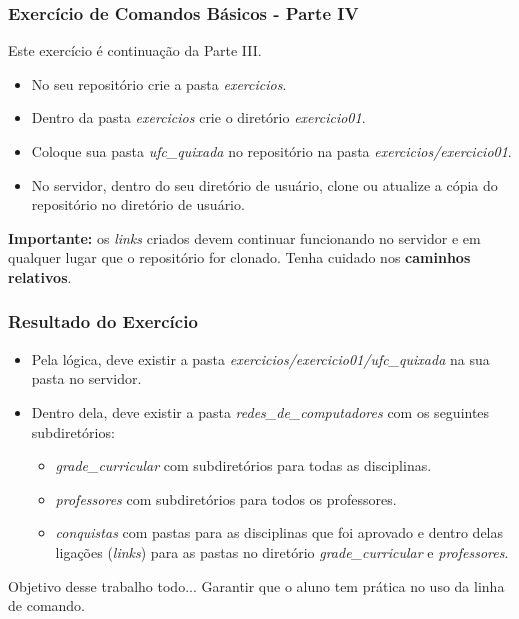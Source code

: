 \documentclass{beamer}
\begin{document}
   \begin{frame}
      \frametitle{Exercício de Comandos Básicos - Parte IV}
      Este exercício é continuação da Parte III.
      \begin{itemize}
         \item No seu repositório crie a pasta \textit{exercicios}.
         \item Dentro da pasta \textit{exercicios} crie o diretório \textit{exercicio01}.
         \item Coloque sua pasta \textit{ufc\_quixada} no repositório na pasta \textit{exercicios/exercicio01}.
	      \item No servidor, dentro do seu diretório de usuário, clone ou atualize a cópia do repositório no diretório de usuário.
      \end{itemize}
      \textbf{Importante:} os \textit{links} criados devem continuar funcionando no servidor e em qualquer lugar que o repositório for clonado.
      Tenha cuidado nos \textbf{caminhos relativos}.
   \end{frame}

   \begin{frame}
      \frametitle{Resultado do Exercício}
      \begin{itemize}
         \item Pela lógica, deve existir a pasta \textit{exercicios/exercicio01/ufc\_quixada} na sua pasta no servidor.
         \item Dentro dela, deve existir a pasta \textit{redes\_de\_computadores} com os seguintes subdiretórios:
         \begin{itemize}
            \item \textit{grade\_curricular} com subdiretórios para todas as disciplinas.
	         \item \textit{professores} com subdiretórios para todos os professores.
	         \item \textit{conquistas} com pastas para as disciplinas que foi aprovado e dentro delas ligações (\textit{links}) para as pastas no diretório \textit{grade\_curricular} e \textit{professores}.  
         \end{itemize}
      \end{itemize}
      \begin{block}{Objetivo desse trabalho todo...}
      Garantir que o aluno tem prática no uso da linha de comando.
      \end{block}
   \end{frame}
\end{document}
